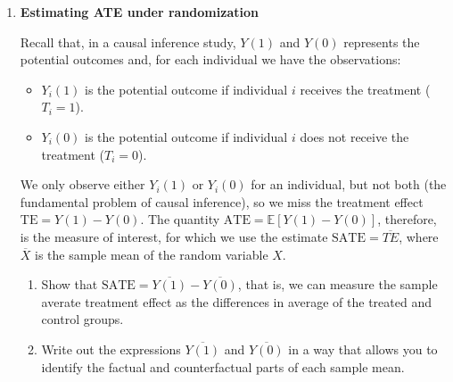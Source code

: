 \documentclass[12pt]{article}
\begin{document}
\begin{enumerate}
\begin{enumerate}[label=(\alph*)]
    \item \textbf{Effect differences between Los Angeles and Amsterdam.}  

    The effect of free public transportation \textbf{depends on the existing commuting habits}:
    
    - In Los Angeles, where most people drive, many commuters would likely switch to public transport, leading to a large reduction in congestion.
    - In Amsterdam, where biking is common, people switching from bikes to public transport would not reduce congestion and might even increase it if emptier streets encourage driving.
    
    \textbf{Conclusion:}  
    Causal effects depend on the population. A treatment can have different effects depending on who is affected. This highlights the importance of considering the study population when evaluating policies.

\end{enumerate}

\fi \color{black}

\item \textbf{Estimating ATE under randomization}

Recall that, in a causal inference study, $Y(1)$ and $Y(0)$ represents the potential outcomes and, for each individual we have the observations:
\begin{itemize}[noitemsep]
    \item \( Y_i(1) \) is the potential outcome if individual \( i \) receives the treatment (\( T_i = 1 \)).
    \item \( Y_i(0) \) is the potential outcome if individual \( i \) does not receive the treatment (\( T_i = 0 \)).
\end{itemize}
We only observe either \( Y_i(1) \) or \( Y_i(0) \) for an individual, but not both (the fundamental problem of causal inference), so we miss the treatment effect $\mathrm{TE} = Y(1) - Y(0)$. 
The quantity $\mathrm{ATE} = \mathbb{E}[Y(1) - Y(0)]$, therefore, is the measure of interest, for which we use the estimate $\mathrm{SATE} = \overline{TE}$, where $\overline{X}$ is the sample mean of the random variable $X$.
\begin{enumerate}[label=(\alph*)]
    \item Show that $\mathrm{SATE} = \overline{Y(1)} - \overline{Y(0)}$, that is, we can measure the sample averate treatment effect as the differences in average of the treated and control groups.
    
    \item Write out the expressions $\overline{Y(1)}$ and $\overline{Y(0)}$ in a way that allows you to identify the factual and counterfactual parts of each sample mean.
    

\end{enumerate}
\end{enumerate}
\end{document}
